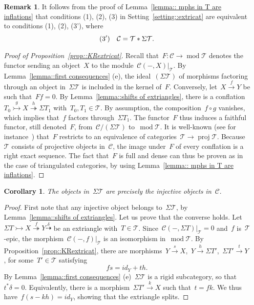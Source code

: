 \documentclass{amsart}
\newtheorem{corollary}[theorem]{Corollary}
\theoremstyle{definition}
\newtheorem{remark}[theorem]{Remark}
\newcommand{\cat}{\mathcal{C}}
\newcommand{\susp}{\Sigma}
\newcommand{\MOD}{\operatorname{mod}}
\newcommand{\proj}{\operatorname{proj}}
\newcommand{\tc}{\mathcal{T}}
\newcommand{\infl}{\rightarrowtail}
\newcommand{\defl}{\twoheadrightarrow}
\newcommand{\modt}{\MOD\tc}
\begin{document}
\begin{remark}
 It follows from the proof of Lemma~\ref{lemma:: mphs in T are inflations} that conditions (1), (2), (3) in Setting~\ref{setting::extricat} are equivalent to conditions (1), (2), (3'), where
\[
{\rm (3')} \ \ \ \cat = \tc\ast\susp\tc.
\]
\end{remark}


\begin{proof}[Proof of Proposition~\ref{prop::KRextricat}]
Recall that~$F:\cat\to\modt$ denotes the functor sending an object~$X$ to the module~$\cat(-,X)|_\tc$.
By Lemma~\ref{lemma::first consequences} (e), the ideal~$(\susp\tc)$ of morphisms factoring through an object in~$\susp\tc$ is included in the kernel of~$F$.
Conversely, let~$X\xrightarrow{f}Y$ be such that~$Ff=0$.
By Lemma~\ref{lemma::shifts of extriangles}, there is a conflation~$T_0\overset{g}{\infl} X\overset{h}{\defl} \susp T_1$ with~$T_0,T_1\in\tc$.
By assumption, the composition~$f\circ g$ vanishes, which implies that~$f$ factors through~$\susp T_1$.
The functor~$F$ thus induces a faithful functor, still denoted~$F$, from~$\cat/(\susp\tc)$ to~$\modt$.
It is well-known (see for instance~\cite[Lemma 3.1]{AssemSimsonSkowronski}) that~$F$ restricts to an equivalence of categories~$\tc\to\proj\tc$.
Because~$\tc$ consists of projective objects in~$\cat$, the image under~$F$ of every conflation is a right exact sequence.
The fact that~$F$ is full and dense can thus be proven as in the case of triangulated categories, by using Lemma~\ref{lemma:: mphs in T are inflations}.
\end{proof}

\begin{corollary}
The objects in~$\susp\tc$ are precisely the injective objects in~$\cat$.
\end{corollary}

\begin{proof}
First note that any injective object belongs to~$\susp \tc$, by Lemma~\ref{lemma::shifts of extriangles}.
Let us prove that the converse holds.
Let~$\susp T \infl X \overset{f}{\defl} Y\overset{\delta}{\dashrightarrow}$ be an extriangle with~$T\in\tc$.
Since~$\cat(-,\susp T)|_\tc = 0$ and~$f$ is~$\tc$-epic, the morphism~$\cat(-,f)|_\tc$ is an isomorphism in~$\modt$.
By Proposition~\ref{prop::KRextricat}, there are morphisms~$Y\overset{s}{\to} X$,~$Y\xrightarrow{h}\susp T'$,~$\susp T'\xrightarrow{t} Y$, for some~$T'\in\tc$ satisfying
\[
fs = id_Y + th.
\]
By Lemma~\ref{lemma::first consequences} (e)~$\susp\tc$ is a rigid subcategory, so that~$t^\ast\delta=0$.
Equivalently, there is a morphism~$\susp T'\xrightarrow{k} X$ such that~$t=fk$.
We thus have~$f(s-kh)=id_Y$, showing that the extriangle splits.
\end{proof}
\end{document}
